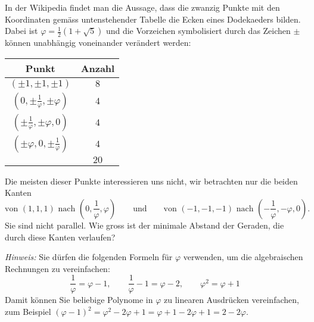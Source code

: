 In der Wikipedia findet man die Aussage, dass die zwanzig Punkte mit
den Koordinaten gemäss untenstehender Tabelle die Ecken eines
Dodekaeders bilden. Dabei ist
$\varphi=\frac12(1+\sqrt{5})$ und die Vorzeichen symbolisiert durch
das Zeichen $\pm$ können unabhängig voneinander verändert werden:
\begin{center}
\begin{tabular}{|c|c|}
\hline
Punkt&Anzahl\\
\hline
$(\pm 1,\pm 1,\pm 1)$&$8$\\
$(0,\pm\frac1{\varphi},\pm\varphi)$&$4$\\
$(\pm\frac1{\varphi},\pm\varphi,0)$&$4$\\
$(\pm\varphi,0,\pm\frac1{\varphi})$&$4$\\
\hline
&$20$\\
\hline
\end{tabular}
\end{center}
Die meisten dieser Punkte interessieren uns nicht, wir betrachten
nur die beiden Kanten
\[
\text{von $(1,1,1)$ nach $(0,\frac1{\varphi},\varphi)$}
\qquad\text{und}\qquad
\text{von $(-1,-1,-1)$ nach $(-\frac1{\varphi},-\varphi,0).$}
\]
Sie sind nicht parallel. Wie gross ist der minimale
Abstand der Geraden, die durch diese Kanten verlaufen?


{\it Hinweis:} Sie dürfen die folgenden Formeln für $\varphi$ verwenden,
um die algebraischen Rechnungen zu vereinfachen:
\[
\frac1{\varphi}=\varphi-1,\qquad
\frac1{\varphi}-1=\varphi-2,\qquad
\varphi^2=\varphi+1
\]
Damit können Sie beliebige Polynome in $\varphi$ zu linearen Ausdrücken
vereinfachen, zum Beispiel $(\varphi-1)^2=\varphi^2-2\varphi+1=\varphi+1-2\varphi+1=2-2\varphi$.


